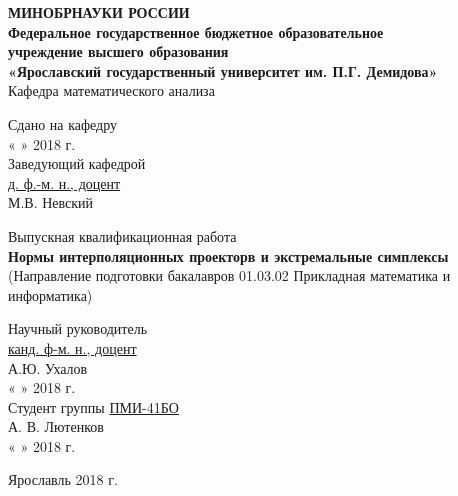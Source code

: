 \documentclass[12pt, a4paper]{extarticle}
\begin{document}
 
\thispagestyle{empty} 
\medskip 
 
\begin{center} 
\textbf{МИНОБРНАУКИ РОССИИ\\ 
\vspace{0.5cm} 
Федеральное государственное бюджетное образовательное\\ 
учреждение высшего образования\\ 
«Ярославский государственный университет им. П.Г. Демидова»}\\ 
\vspace{0.5cm} 
{Кафедра математического анализа}\\ 
\vspace{1.5cm} 

\end{center}
\begin{flushright} 
	Сдано на кафедру\\
		« 
	\underline{\phantom{aaa}} 
	» 
	\underline{\phantom{aaaaaaaaaaaaa}} 2018 г.\\ 
	Заведующий кафедрой\\
	\underline{\phantom{aaa}д. ф.-м. н., доцент\phantom{aaa}}\\ 
	\vspace{0.1cm} 
	\underline{\phantom{aaaaaaaaaaaaa}} М.В. Невский
\end{flushright}
\vspace{3cm} 
\begin{center} 
Выпускная квалификационная работа\\ 
\vspace{0.5cm} 
\textbf{Нормы интерполяционных проекторв и экстремальные симплексы}\\ 
(Направление подготовки бакалавров 01.03.02 Прикладная математика и информатика)
\vspace{3cm} 
\end{center} 
 
\begin{flushright} 
Научный руководитель\\ 
	\underline{\phantom{aaa}канд. ф-м. н., доцент\phantom{aaa}}\\ 
	\vspace{0.1cm} 
\underline{\phantom{aaaaaaaaaaaaa}} А.Ю. Ухалов\\ 
« 
\underline{\phantom{aaa}} 
» 
\underline{\phantom{aaaaaaaaaaaaa}} 2018 г.\\ 
\vspace{0.5cm} 
Студент группы \underline{\phantom{a}ПМИ-41БО\phantom{a}}\\ 
\vspace{0.1cm} 
\underline{\phantom{aaaaaaaaaaaaa}} А. В. Лютенков\\ 
« 
\underline{\phantom{aaa}} 
» 
\underline{\phantom{aaaaaaaaaaaaaa}}2018 г.\\ 
\vspace{1cm} 
\end{flushright} 
\begin{center} 
Ярославль 2018 г.
\vspace{-1cm}  
\end{center} 
\end{document}
